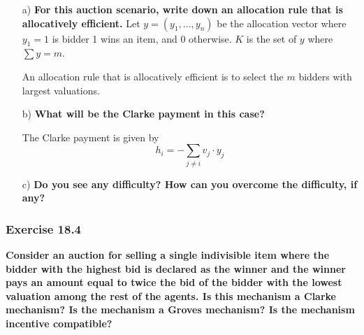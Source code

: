 \documentclass[12pt, a4paper]{article}
\begin{document}
\begin{enumerate}
	\item[a)] \textbf{For this auction scenario, write down an allocation rule that is allocatively efficient.}
	Let $y=(y_1,...,y_n)$ be the allocation vector where $y_1 = 1$ is bidder 1 wins an item, and 0 otherwise. $K$ is the set of $y$ where $\sum y = m$.

	An allocation rule that is allocatively efficient is to select the $m$ bidders with largest valuations.

	\item[b)] \textbf{What will	be the Clarke payment in this case?}
	
	The Clarke payment is given by
	\[ h_i = -\sum_{j\neq i} v_j\cdot y_j\]
	
	\item[c)] \textbf{Do you see any difficulty? How can you overcome the difficulty, if any?}


\end{enumerate}

\subsubsection*{Exercise 18.4}

\textbf{Consider an auction for selling a single indivisible item where the bidder with the highest bid is declared as the winner and the winner pays an amount equal to twice the bid of the bidder with the lowest valuation among the rest of the agents. Is this mechanism a Clarke mechanism? Is the mechanism a Groves mechanism? Is the mechanism incentive compatible?}



\end{document}
